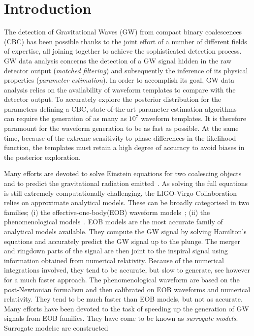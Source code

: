 \section{Introduction}
The detection of Gravitational Waves (GW) from compact binary coalescences (CBC) has been possible thanks to the joint effort of a number of different fields of expertise, all joining together to achieve the sophisticated detection process. GW data analysis concerns the detection of a GW signal hidden in the raw detector output (\textit{matched filtering}) and subsequently the inference of its physical properties (\textit{parameter estimation}). In order to accomplish its goal, GW data analysis relies on the availability of waveform templates  to compare with the detector output.
To accurately explore the posterior distribution for the parameters defining a CBC, state-of-the-art parameter estimation algorithms~\cite{lalinference} can require the generation of as many as $10^7$ waveform templates. It is therefore paramount for the waveform generation to be as fast as possible. At the same time, because of the extreme sensitivity to phase differences in the likelihood  function, the templates must retain a high degree of accuracy to avoid biases in the posterior exploration.
\par
Many efforts are devoted to solve Einstein equations for two coalescing objects and to predict the gravitational radiation emitted~\cite{}.
As solving the full equations is still extremely computationally challenging, the LIGO-Virgo Collaboration relies on approximate analytical models. These can be broadly categorised in  two families; (i) the effective-one-body(EOB) waveform models~\cite{}; (ii) the phenomenological models~\cite{}. 
EOB models are the most accurate family of analytical models available. They compute the GW signal by solving Hamilton's equations and accurately predict the GW signal up to the plunge. The merger and ringdown  parts 
of the signal are then joint to the inspiral signal using information obtained from numerical relativity. Because of the numerical integrations involved, they tend to be accurate, but slow to generate, see however \cite{} for a much faster approach. The phenomenological waveform are based on the post-Newtonian 
formalism and then calibrated on EOB waveforms and numerical relativity. They tend to be much faster than EOB 
models, but not as accurate.
Many efforts have been devoted to the task of speeding up the generation of GW signals from EOB families.
They have come to be known as \textit{surrogate models}. Surrogate modelse are constructed 
